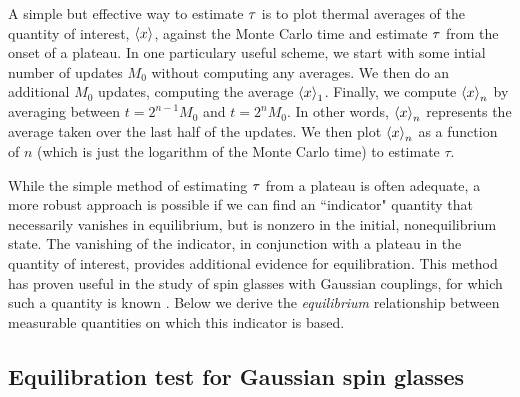 A simple but effective way to estimate $\tau$ is to plot thermal averages
of the quantity of interest, $\left< x \right>$, against the Monte Carlo time and
estimate $\tau$ from the onset of a plateau. In one particulary useful
scheme,
we start with some intial number of updates $M_0$ without computing any
averages. We then do an additional $M_0$ updates, computing the average
$\left< x \right>_1$. Finally, we compute $\left< x \right>_n$ by averaging between $t = 2^{n-1}
M_0$ and $t = 2^n M_0$. In other words, $\left< x \right>_n$ represents the average taken
over the last half of the updates. We then plot $\left< x \right>_n$ as a function of $n$
(which is just the logarithm of the Monte Carlo time) to estimate $\tau$.



While the simple method of estimating $\tau$ from a plateau is often
adequate, a more robust approach is possible if we can find an ``indicator"
quantity that necessarily vanishes in equilibrium, but is nonzero in the
initial, nonequilibrium state.
The vanishing of the indicator, in conjunction with a plateau in the quantity
of interest, provides additional evidence for equilibration. This method has
proven useful in the study of spin glasses with Gaussian couplings, for which
such a quantity is known \autocite{katzgraber2003monte}. Below we derive the
\emph{equilibrium} relationship between measurable quantities on which this
indicator is based.


\subsection{Equilibration test for Gaussian spin glasses}
\label{sec:equilibration-test-gaussian}

